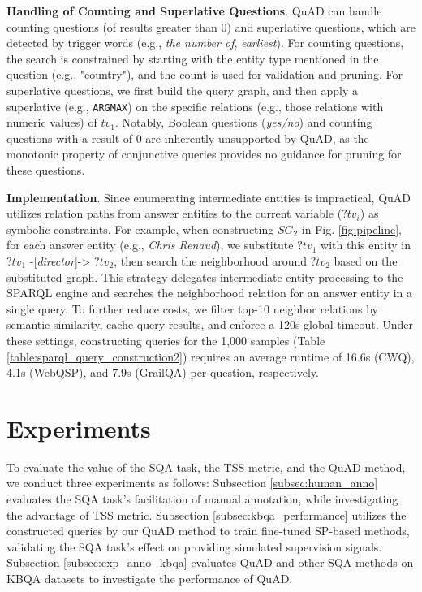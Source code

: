 \documentclass[runningheads]{llncs}
\begin{document}
\noindent \textbf{Handling of Counting and Superlative Questions}.
QuAD can handle counting questions (of results greater than 0) and superlative questions, which are detected by trigger words (e.g., \textit{the number of}, \textit{earliest}). For counting questions, the search is constrained by starting with the entity type mentioned in the question (e.g., "country"), and the count is used for validation and pruning. For superlative questions, we first build the query graph, and then apply a superlative (e.g., \texttt{ARGMAX}) on the specific relations (e.g., those relations with numeric values) of $tv_1$.
Notably, Boolean questions (\textit{yes/no}) and counting questions with a result of 0 are inherently unsupported by QuAD, as the monotonic property of conjunctive queries provides no guidance for pruning for these questions.

\noindent\textbf{Implementation}.
Since enumerating intermediate entities is impractical, QuAD utilizes relation paths from answer entities to the current variable ($?tv_i$) as symbolic constraints. 
For example, when constructing $SG_2$ in Fig. \ref{fig:pipeline}, for each answer entity (e.g., \textit{Chris Renaud}), we substitute $?tv_1$ with this entity in $?tv_1$ -[\textit{director}]-> $?tv_2$, then search the neighborhood around $?tv_2$ based on the substituted graph. This strategy delegates intermediate entity processing to the SPARQL engine and searches the neighborhood relation for an answer entity in a single query.
To further reduce costs, we filter top-10 neighbor relations by semantic similarity, cache query results, and enforce a 120s global timeout.
Under these settings, constructing queries for the 1,000 samples (Table \ref{table:sparql_query_construction2}) requires an average runtime of 16.6s (CWQ), 4.1s (WebQSP), and 7.9s (GrailQA) per question, respectively.

\section{Experiments}\label{sec:experiment}
To evaluate the value of the SQA task, the TSS metric, and the QuAD method, we conduct three experiments as follows:
Subsection \ref{subsec:human_anno} evaluates the SQA task's facilitation of manual annotation, while investigating the advantage of TSS metric. Subsection \ref{subsec:kbqa_performance} utilizes the constructed queries by our QuAD method to train fine-tuned SP-based methods, validating the SQA task's effect on providing simulated supervision signals. Subsection \ref{subsec:exp_anno_kbqa} evaluates QuAD and other SQA methods on KBQA datasets to investigate the performance of QuAD.
\end{document}
